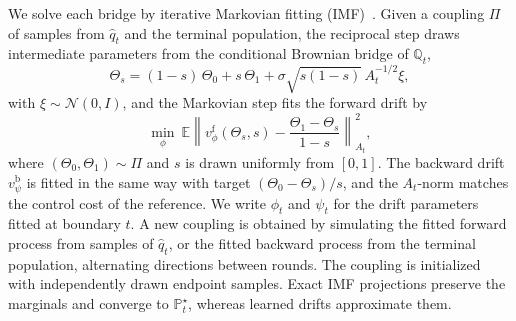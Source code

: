 \documentclass{article}
\begin{document}
We solve each bridge by iterative Markovian fitting
(IMF)~\cite{shi2023dsbm,peluchetti2023idbm}. Given a coupling $\Pi$ of samples
from $\hat q_t$ and the terminal population, the reciprocal step draws
intermediate parameters from the conditional Brownian bridge of $\mathbb{Q}_t$,
\begin{equation}
    \Theta_s=(1-s)\,\Theta_0+s\,\Theta_1+\sigma\sqrt{s(1-s)}\,A_t^{-1/2}\xi,
    \label{eq:conditionalbridge}
\end{equation}
with $\xi\sim\mathcal{N}(0,I)$, and the Markovian step fits the forward drift by
\begin{equation}
    \min_\phi\ \mathbb{E}\left\|v^{\mathrm{f}}_\phi(\Theta_s,s)
    -\frac{\Theta_1-\Theta_s}{1-s}\right\|_{A_t}^{2},
    \label{eq:lossf}
\end{equation}
where $(\Theta_0,\Theta_1)\sim\Pi$ and $s$ is drawn uniformly from $[0,1]$. The
backward drift $v^{\mathrm{b}}_\psi$ is fitted in the same way with target
$(\Theta_0-\Theta_s)/s$, and the $A_t$-norm matches the control cost of the
reference. We write $\phi_t$ and $\psi_t$ for the drift parameters fitted at
boundary $t$. A new coupling is obtained by simulating the fitted forward process
from samples of $\hat q_t$, or the fitted backward process from the terminal
population, alternating directions between rounds. The coupling is initialized
with independently drawn endpoint samples. Exact IMF projections preserve the
marginals and converge to $\mathbb{P}^\star_t$, whereas learned drifts
approximate them. 

\end{document}
